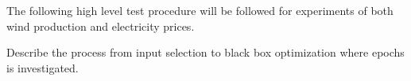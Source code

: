 The following high level test procedure will be followed for experiments of both wind production and electricity prices. 

Describe the process from input selection to black box optimization where epochs is investigated.

